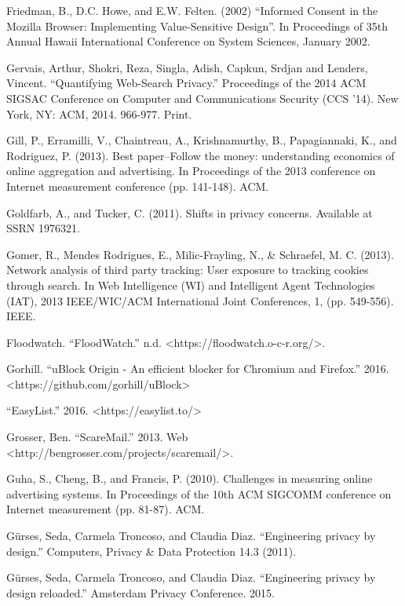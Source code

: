 \documentclass[conference]{IEEEtran}
\begin{document}
\begin{thebibliography}{99}
 Friedman, B., D.C. Howe, and E.W. Felten. (2002) ``Informed Consent in the Mozilla Browser: Implementing Value-Sensitive Design''. In Proceedings of 35th Annual Hawaii International Conference on System Sciences, January 2002.

 Gervais, Arthur, Shokri, Reza, Singla, Adish, Capkun, Srdjan and Lenders, Vincent. ``Quantifying Web-Search Privacy.'' Proceedings of the 2014 ACM SIGSAC Conference on Computer and Communications Security (CCS '14). New York, NY: ACM, 2014. 966-977. Print.

 Gill, P., Erramilli, V., Chaintreau, A., Krishnamurthy, B., Papagiannaki, K., and Rodriguez, P. (2013). Best paper--Follow the money: understanding economics of online aggregation and advertising. In Proceedings of the 2013 conference on Internet measurement conference (pp. 141-148). ACM.

 Goldfarb, A., and Tucker, C. (2011). Shifts in privacy concerns. Available at SSRN 1976321.

 Gomer, R., Mendes Rodrigues, E., Milic-Frayling, N., \& Schraefel, M. C. (2013). Network analysis of third party tracking: User exposure to tracking cookies through search. In Web Intelligence (WI) and Intelligent Agent Technologies (IAT), 2013 IEEE/WIC/ACM International Joint Conferences, 1, (pp. 549-556). IEEE.

 Floodwatch. ``FloodWatch.'' n.d. <https://floodwatch.o-c-r.org/>.

 Gorhill. ``uBlock Origin - An efficient blocker for Chromium and Firefox.'' 2016. <https://github.com/gorhill/uBlock>

 ``EasyList.'' 2016. <https://easylist.to/>

 Grosser, Ben. ``ScareMail.'' 2013. Web <http://bengrosser.com/projects/scaremail/>.

 Guha, S., Cheng, B., and Francis, P. (2010). Challenges in measuring online advertising systems. In Proceedings of the 10th ACM SIGCOMM conference on Internet measurement (pp. 81-87). ACM.

 Gürses, Seda, Carmela Troncoso, and Claudia Diaz. ``Engineering privacy by design.'' Computers, Privacy \& Data Protection 14.3 (2011).

 Gürses, Seda, Carmela Troncoso, and Claudia Diaz. ``Engineering privacy by design reloaded.'' Amsterdam Privacy Conference. 2015.


\end{thebibliography}
\end{document}
